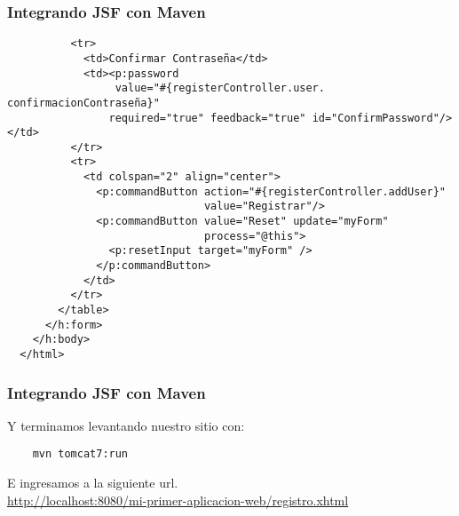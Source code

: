 \documentclass{beamer}
\begin{document}
\begin{frame}[fragile]
  \frametitle{Integrando JSF con Maven}
  \begin{verbatim}
          <tr>
            <td>Confirmar Contraseña</td>
            <td><p:password
                 value="#{registerController.user. confirmacionContraseña}"
                required="true" feedback="true" id="ConfirmPassword"/></td>
          </tr>
          <tr>
            <td colspan="2" align="center">
              <p:commandButton action="#{registerController.addUser}"
                               value="Registrar"/>
              <p:commandButton value="Reset" update="myForm"
                               process="@this">
                <p:resetInput target="myForm" />
              </p:commandButton>
            </td>
          </tr>
        </table>
      </h:form>
    </h:body>
  </html>
  \end{verbatim}
\end{frame}

\begin{frame}[fragile]
  \frametitle{Integrando JSF con Maven}
  Y terminamos levantando nuestro sitio con:

  \begin{verbatim}
    mvn tomcat7:run
  \end{verbatim}

  E ingresamos a la siguiente url.\\

  \url{http://localhost:8080/mi-primer-aplicacion-web/registro.xhtml}
\end{frame}
\end{document}
